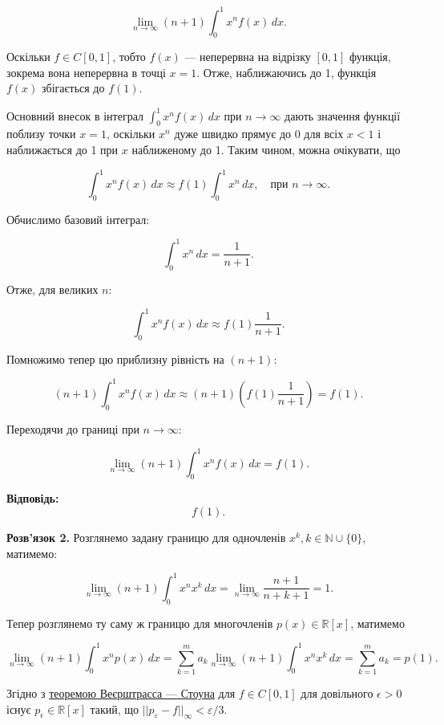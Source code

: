 \documentclass{article}
\begin{document}
\[
\lim_{n \to \infty} (n + 1) \int_0^1 x^n f(x)\,dx.
\]

Оскільки \( f \in C[0, 1] \), тобто \( f(x) \) — неперервна на відрізку \([0,1]\) функція, зокрема вона неперервна в точці \( x = 1 \). Отже, наближаючись до 1, функція \( f(x) \) збігається до \( f(1) \).

Основний внесок в інтеграл \(\int_0^1 x^n f(x) \, dx\) при \( n \to \infty \) дають значення функції поблизу точки \( x = 1 \), оскільки \( x^n \) дуже швидко прямує до 0 для всіх \( x < 1 \) і наближається до 1 при \( x \) наближеному до 1. Таким чином, можна очікувати, що

\[
\int_0^1 x^n f(x)\,dx \approx f(1) \int_0^1 x^n \, dx, \quad \text{при } n \to \infty.
\]

Обчислимо базовий інтеграл:

\[
\int_0^1 x^n \, dx = \frac{1}{n+1}.
\]

Отже, для великих \( n \):

\[
\int_0^1 x^n f(x)\,dx \approx f(1)\frac{1}{n+1}.
\]

Помножимо тепер цю приблизну рівність на \( (n+1) \):

\[
(n+1) \int_0^1 x^n f(x)\,dx \approx (n+1) \left( f(1)\frac{1}{n+1} \right) = f(1).
\]

Переходячи до границі при \( n \to \infty \):

\[
\lim_{n \to \infty} (n + 1) \int_0^1 x^n f(x)\,dx = f(1).
\]

\textbf{Відповідь:}  
\[
\boxed{f(1)}.
\]


\textbf{Розв’язок 2.} Розглянемо задану границю для одночленів $x^k, k \in \mathbb{N} \cup \{0\}$, матимемо:

\[
\lim_{n \to \infty} (n + 1) \int_{0}^{1} x^n x^k \, dx = \lim_{n \to \infty} \frac{n + 1}{n+k+1} = 1.
\]

Тепер розглянемо ту саму ж границю для многочленів $p(x) \in \mathbb{R}[x]$, матимемо

\[
\lim_{n \to \infty} (n + 1)  \int_{0}^{1} x^n p(x) \, dx = \sum_{k=1}^m a_k \lim_{n \to \infty}  (n + 1)   \int_{0}^{1} x^n x^k\, dx = \sum_{k=1}^m a_k = p(1).
\]

Згідно з  \href{https://uk.wikipedia.org/wiki/%D0%A2%D0%B5%D0%BE%D1%80%D0%B5%D0%BC%D0%B0_%D0%92%D0%B5%D1%94%D1%80%D1%88%D1%82%D1%80%D0%B0%D1%81%D1%81%D0%B0_%E2%80%94_%D0%A1%D1%82%D0%BE%D1%83%D0%BD%D0%B0#%D0%A2%D0%B5%D0%BE%D1%80%D0%B5%D0%BC%D0%B0_%D0%92%D0%B5%D1%94%D1%80%D1%88%D1%82%D1%80%D0%B0%D1%81%D1%81%D0%B0}{теоремою Веєрштрасса — Стоуна} для $f \in C[0, 1]$ для довільного $\epsilon>0$ існує $p_\epsilon \in \mathbb{R}[x]$ такий, що $||p_\varepsilon-f||_\infty < \varepsilon/3$.
\end{document}
